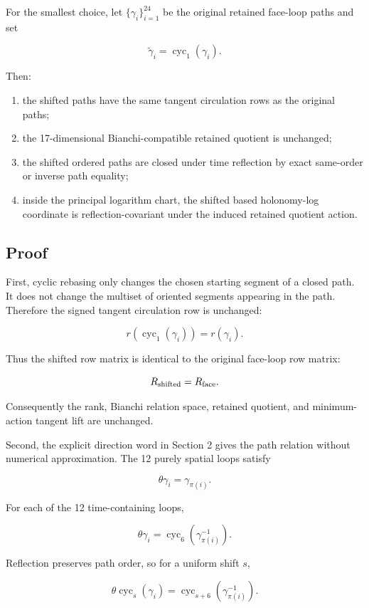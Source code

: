 \documentclass[10pt]{article}
\begin{document}
For the smallest choice, let \(\{\gamma_i\}_{i=1}^{24}\) be the original retained face-loop paths and set

\[
\widetilde\gamma_i=\operatorname{cyc}_1(\gamma_i).
\]

Then:

\begin{enumerate}[leftmargin=*]
\item the shifted paths have the same tangent circulation rows as the original paths;
\item the 17-dimensional Bianchi-compatible retained quotient is unchanged;
\item the shifted ordered paths are closed under time reflection by exact same-order or inverse path equality;
\item inside the principal logarithm chart, the shifted based holonomy-log coordinate is reflection-covariant under the induced retained quotient action.
\end{enumerate}

\subsection{Proof}

First, cyclic rebasing only changes the chosen starting segment of a closed path.  It does not change the multiset of oriented segments appearing in the path.  Therefore the signed tangent circulation row is unchanged:

\[
r(\operatorname{cyc}_1(\gamma_i))=r(\gamma_i).
\]

Thus the shifted row matrix is identical to the original face-loop row matrix:

\[
R_{\rm shifted}=R_{\rm face}.
\]

Consequently the rank, Bianchi relation space, retained quotient, and minimum-action tangent lift are unchanged.

Second, the explicit direction word in Section 2 gives the path relation without numerical approximation.  The 12 purely spatial loops satisfy

\[
\theta\gamma_i=\gamma_{\pi(i)}.
\]

For each of the 12 time-containing loops,

\[
\theta\gamma_i
=
\operatorname{cyc}_6(\gamma_{\pi(i)}^{-1}).
\]

Reflection preserves path order, so for a uniform shift \(s\),

\[
\theta\operatorname{cyc}_s(\gamma_i)
=
\operatorname{cyc}_{s+6}(\gamma_{\pi(i)}^{-1}).
\]
\end{document}
